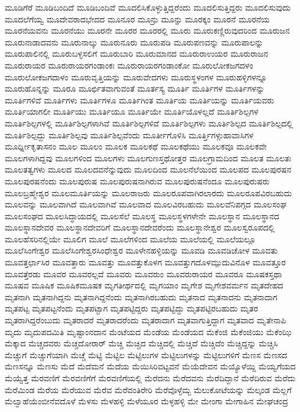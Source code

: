 {ಮೂಡಿಗೆರೆ
ಮೂಡಿಬಂದಿದೆ
ಮೂಡಿಬಂದಿವೆ
ಮೂದಲಿಸಿಕೊಳ್ಳುತ್ತಿದ್ದರೆಂದು
ಮೂದಲಿಸುತ್ತಿದ್ದರು
ಮೂದಲಿಸುವುದು
ಮೂದಲೆಗೆಯ್ವ
ಮೂದೇವರಾದಭೇದದ
ಮೂನೂರ
ಮೂನ್ರು
ಮೂನ್ಱು
ಮೂರಕ್ಕಂ
ಮೂರನೆ
ಮೂರನೆಯ
ಮೂರನೆಯವನು
ಮೂರನೆಯು
ಮೂರನೇ
ಮೂರರ
ಮೂರರಲ್ಲಿ
ಮೂರು
ಮೂರುಕಣ್ಣಿರುವುದರಿಂದ
ಮೂರುಜನ
ಮೂರುನಾಡಾದವನು
ಮೂರುನಾಲ್ಕು
ಮೂರುನೂರು
ಮೂರುಪಡಿ
ಮೂರುಪಣವನ್ನು
ಮೂರುಪಾಲನ್ನು
ಮೂರುಪಾಲಿನಲ್ಲಿ
ಮೂರುಬಳ್ಳಸಲಿಗೆ
ಮೂರುಬಾರಿ
ಮೂರುಮಾನದ
ಮೂರುರಾಉಯರ
ಮೂರುರಾಜನ
ಮೂರುರಾಯರ
ಮೂರುರಾಯರಗಂಡಾಂಕಃ
ಮೂರುರಾಯರಗಂಡಾಂಕೋ
ಮೂರುಲೋಕಜಗದಳಂ
ಮೂರುಲೋಕಜಗದಾಳಂ
ಮೂರುವೃತ್ತಿಯನ್ನು
ಮೂರುವೇದಗಳು
ಮೂರುಸ್ಥಳಂಗಳ
ಮೂರುಹಳ್ಳಿಗಳನ್ನೂ
ಮೂರುಹೊನ್ನನ್ನು
ಮೂರೂ
ಮೂರ್ಛಿತವಾಗುವಂತೆ
ಮೂರ್ತಸ್ಯ
ಮೂರ್ತಿ
ಮೂರ್ತಿಗಳ
ಮೂರ್ತಿಗಳನ್ನು
ಮೂರ್ತಿಗಳಿವೆ
ಮೂರ್ತಿಗಳು
ಮೂರ್ತಿಗಳೂ
ಮೂರ್ತಿಗಿಂತ
ಮೂರ್ತಿಯ
ಮೂರ್ತಿಯನ್ನು
ಮೂರ್ತಿಯವರು
ಮೂರ್ತಿಯಾಗಲೀ
ಮೂರ್ತಿಯು
ಮೂರ್ತಿಯೂ
ಮೂರ್ತಿಯೇ
ಮೂರ್ತಿಯೊಳಲ್ಲದೆ
ಮೂರ್ತಿಶಿಲ್ಪಗಳ
ಮೂರ್ತಿಶಿಲ್ಪಗಳಲ್ಲಿ
ಮೂರ್ತಿಶಿಲ್ಪಗಳಾಗಿವೆ
ಮೂರ್ತಿಶಿಲ್ಪಗಳಿವೆ
ಮೂರ್ತಿಶಿಲ್ಪಗಳು
ಮೂರ್ತಿಶಿಲ್ಪದ
ಮೂರ್ತಿಶಿಲ್ಪದಲ್ಲಿ
ಮೂರ್ತಿಶಿಲ್ಪದ್ದು
ಮೂರ್ತಿಶಿಲ್ಪವು
ಮೂರ್ತಿಶಿಲ್ಪವೆಂದು
ಮೂರ್ತೀಗೊಳಿಸಿ
ಮೂರ್ತ್ತಿಗಳ್ಗುಹಾವಾಸಿಗಳ
ಮೂರ್ಧ್ನೀಕೃತಾಸನಂ
ಮೂಲ
ಮೂಲಂ
ಮೂಲಕ
ಮೂಲಕಥೆ
ಮೂಲಕಥೆಯು
ಮೂಲಕವೂ
ಮೂಲಕವೇ
ಮೂಲಗಳಾಗಿದ್ದವು
ಮೂಲಗಳಿಂದ
ಮೂಲಗಳು
ಮೂಲಗುಣಸ್ತಥೋತ್ತರ
ಮೂಲಗ್ರಾಮದಿಂದ
ಮೂಲತ
ಮೂಲತಃ
ಮೂಲತತ್ವಗಳು
ಮೂಲದ
ಮೂಲದವನೆನ್ನುವುದು
ಮೂಲದಿಂದ
ಮೂಲನೆಲೆಯಿಂದ
ಮೂಲಪದ
ಮೂಲಪುರಷನ
ಮೂಲಪುರಷನೆಂದು
ಮೂಲಪುರುಷ
ಮೂಲಪುರುಷನಾಗಿರುವ
ಮೂಲಪುರುಷನೆಂದೂ
ಮೂಲಪುರುಷರು
ಮೂಲಬ್ರಹ್ಮೇಶ್ವರ
ಮೂಲಮೂರ್ತಿಯನ್ನು
ಮೂಲರಾಜರು
ಮೂಲರೂಪವಾಗಿರಲಾರದು
ಮೂಲರೂಪವಿರಬಹುದು
ಮೂಲವನ್ನು
ಮೂಲವಾಗಿದೆ
ಮೂಲವಾಗಿವೆ
ಮೂಲವಾದ
ಮೂಲವಿರಬಹುದು
ಮೂಲವೆನಿಪಗ್ಗದ
ಮೂಲಸಂಘ
ಮೂಲಸಂಘದ
ಮೂಲಸಿದ್ಧಾಯದಲ್ಲಿ
ಮೂಲಸೆಲೆ
ಮೂಲಸ್ಥ
ಮೂಲಸ್ಥಳಗಳೇನೇ
ಮೂಲಸ್ಥಾನ
ಮೂಲಸ್ಥಾನದ
ಮೂಲಸ್ಥಾನದೇವರ
ಮೂಲಸ್ಥಾನದೇವರಿಗೆ
ಮೂಲಸ್ಥಾನದೇವರೆಂದು
ಮೂಲಸ್ಥಾನೇಶ್ವರ
ಮೂಲಸ್ವರೂಪದಲ್ಲಿ
ಮೂಲಹೆಸರಿನಲ್ಲಿಯೇ
ಮೂಲಿಗ
ಮೂಲೆ
ಮೂಲೆಗಳಿಂದ
ಮೂಲೆಯ
ಮೂಲೆಯಲ್ಲಿ
ಮೂಲೆಯಲ್ಲೂ
ಮೂಲೆಸಿಂಗೇಶ್ವರ
ಮೂಲೆಸಿಂಗೇಶ್ವರಸಿಂಧೇಶ್ವರ
ಮೂಳೇನಹಳ್ಳಿಯನ್ನು
ಮೂವಡಿ
ಮೂವಡಿಚೋಳ
ಮೂವತು
ಮೂವತ್ತರ್ಛಾಸಿರ
ಮೂವತ್ತಾರು
ಮೂವತ್ತು
ಮೂವತ್ತುಕೊಳಗ
ಮೂವತ್ತುಗದೊಳಮ್ಪುದುವಿನೊಳ
ಮೂವತ್ತೂರ
ಮೂವತ್ತೆರಡು
ಮೂವರ
ಮೂವರಲ್ಲದೆ
ಮೂವರು
ಮೂವರುಂ
ಮೂವರುರಾಯರ
ಮೂವರೂ
ಮೂಷಕಸ್ತಥಾ
ಮೂಷವ
ಮೂಷಿಕ
ಮೂಷಿಕಮೂಷಕ
ಮೃಗತೀರ್ಥದಲ್ಲಿ
ಮೃಗಯಾಂ
ಮೃಗೇಶ
ಮೃಗೇಶವರ್ಮನ
ಮೃತದೇಹದ
ಮೃತನಾಗಿ
ಮೃತನಾಗಿದ್ದನು
ಮೃತನಾಗಿದ್ದನೆಂದು
ಮೃತನಾಗಿರಬಹುದು
ಮೃತನಾದ
ಮೃತನಾದನು
ಮೃತನಾದಾಗ
ಮೃತಪಟ್ಟ
ಮೃತಪಟ್ಟನೆಂದು
ಮೃತಪಟ್ಟಾಗ
ಮೃತಪಟ್ಟಿದ್ದರು
ಮೃತಪಟ್ಟಿದ್ದು
ಮೃತಪಟ್ಟಿರಬಹುದು
ಮೃತರ
ಮೃತರಾಗಿದ್ದರೆಂಬುದು
ಮೃತರಾದರೆ
ಮೃತರಾದರೆಂದು
ಮೃತರಾದಾಗ
ಮೃತವಾಗುತ್ತಿದ್ದಾಗ
ಮೃತವಾದ
ಮೃತೇನಾಪಿ
ಮೃದು
ಮೃದುಪದಮಿತಿ
ಮೃಷ್ಟಾಂನದಾನ
ಮೆಂಟೆಯದ
ಮೆಂಡೆಯ
ಮೆಂಡೆಯದ
ಮೆಕೆಂಜಿ
ಮೆಕೆಂಜಿಯು
ಮೆಕೆಂಝಿ
ಮೆಕ್ಕಾದ
ಮೆಚ್ಚದವರು
ಮೆಚ್ಚದೋರಾರ್
ಮೆಚ್ಚಿ
ಮೆಚ್ಚಿದ
ಮೆಚ್ಚಿದಲ್ಲಿ
ಮೆಚ್ಚಿದೆ
ಮೆಚ್ಚಿದೆಂ
ಮೆಚ್ಚಿದ್ದನ್ನು
ಮೆಚ್ಚಿಸಿ
ಮೆಚ್ಚುಗೆ
ಮೆಚ್ಚುಗೆಯಾಗಿ
ಮೆಚ್ಚೆ
ಮೆಟ್ಟಿ
ಮೆಟ್ಟಿಲ
ಮೆಟ್ಟಿಲುಗಳ
ಮೆಟ್ಟಿಲುಗಳನ್ನು
ಮೆಟ್ಟಿಲುಗಳಿಗೆ
ಮೆಣಸ
ಮೆಣಸದ
ಮೆಣಸನ್ನೂ
ಮೆಣಸು
ಮೆದೆ
ಮೆದೆಮನೆ
ಮೆದೆಯ
ಮೆಯಿಸಿರಿವಟ್ಟವನೆ
ಮೆಯೆದೇವನ
ಮೆಯ್ಯೊಳೆಯ್ದಿ
ಮೆಯ್ವಗೆಯದ
ಮೆಯ್ವೆತ್ತ
ಮೆರವಣಿಗೆ
ಮೆರವಣಿಗೆಗೆ
ಮೆರವಣಿಗೆಯಲ್ಲಿ
ಮೆರೆದನು
ಮೆರೆದವನು
ಮೆರೆದಿದ್ದಾನೆ
ಮೆರೆದಿರುವ
ಮೆರೆದು
ಮೆರೆಮಿಂಡ
ಮೆರೆಯ
ಮೆರೆಯುವ
ಮೆರೆವ
ಮೆರೆವಂತಿರೇರಿ
ಮೆರೆವೊಳ್ಳೆಮ್ಬ
ಮೆಲುಕೋಟೆಯನ್ನು
ಮೆಲ್ಕಂಡ
ಮೆಲ್ಲಗೆ
ಮೆಲ್ವಾಹೆಯೆಂಬೀನೆವದೊಳೆ
ಮೆಳಸು
ಮೆಳಹಳ್ಳಿ
ಮೆಳೆಯೂರ
ಮೆಳ್ಳಹಳ್ಳಿ
ಮೇ
ಮೇಂಗಾ
ಮೇಗಾಹಿನ
ಮೇಘಚಂದ್ರ
}
